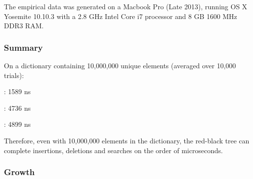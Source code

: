 The empirical data was generated on a Macbook Pro (Late 2013), running OS X Yosemite 10.10.3 with a 2.8 GHz Intel Core i7 processor and 8 GB 1600 MHz DDR3 RAM.

\subsubsection{Summary}
On a dictionary containing 10,000,000 unique  elements (averaged over 10,000 trials):

: 1589 ns

: 4736 ns

: 4899 ns

Therefore, even with 10,000,000 elements in the dictionary, the red-black tree can complete insertions, deletions and searches on the order of microseconds.
\subsubsection{Growth}